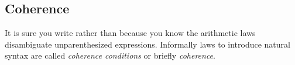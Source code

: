 \subsection{Coherence}

It is sure you write
rather than
because you know the arithmetic laws
disambiguate unparenthesized expressions.
Informally laws to introduce natural syntax are called \emph{coherence conditions} or briefly \emph{coherence}.

